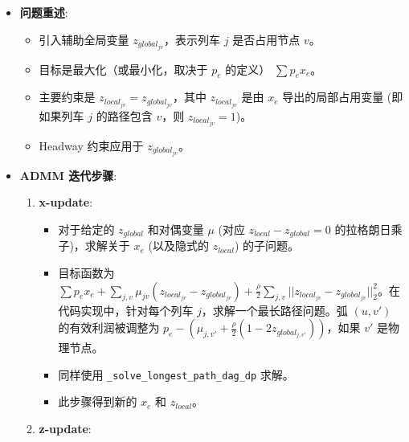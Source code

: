 \documentclass{article}
\begin{document}
\begin{itemize}
    \item \textbf{问题重述}:
        \begin{itemize}
            \item 引入辅助全局变量 $z_{global_{jv}}$，表示列车 $j$ 是否占用节点 $v$。
            \item 目标是最大化（或最小化，取决于 $p_e$ 的定义） $\sum p_e x_e$。
            \item 主要约束是 $z_{local_{jv}} = z_{global_{jv}}$，其中
                $z_{local_{jv}}$ 是由 $x_e$ 导出的局部占用变量 (即如果列车 $j$ 的路径包含
                $v$，则 $z_{local_{jv}}=1$)。
            \item Headway 约束应用于 $z_{global_{jv}}$。
        \end{itemize}
    \item \textbf{ADMM 迭代步骤}:
        \begin{enumerate}
            \item \textbf{x-update}:
                \begin{itemize}
                    \item 对于给定的 $z_{global}$ 和对偶变量 $\mu$ (对应
                        $z_{local} - z_{global} = 0$ 的拉格朗日乘子)，求解关于
                        $x_e$ (以及隐式的 $z_{local}$) 的子问题。
                    \item 目标函数为 $\sum p_e x_e + \sum_{j,v} \mu_{jv}
                        (z_{local_{jv}} - z_{global_{jv}}) +
                        \frac{\rho}{2} \sum_{j,v} ||z_{local_{jv}} -
                        z_{global_{jv}}||_2^2$。在代码实现中，针对每个列车
                        $j$，求解一个最长路径问题。弧 $(u,v')$ 的有效利润被调整为 $p_e -
                        (\mu_{j,v'} + \frac{\rho}{2} (1 - 2
                        z_{global_{j,v'}}))$，如果 $v'$ 是物理节点。
                    \item 同样使用 \texttt{\_solve\_longest\_path\_dag\_dp} 求解。
                    \item 此步骤得到新的 $x_e$ 和 $z_{local}$。
                \end{itemize}
            \item \textbf{z-update}:
                \begin{itemize}
                    \item 对于给定的 $z_{local}$ 和 $\mu$，求解关于 $z_{global}$ 的子问题。
                    \item 目标是最小化 $\sum_{j,v} [-\mu_{jv}

\end{itemize}
\end{enumerate}
\end{itemize}
\end{document}
